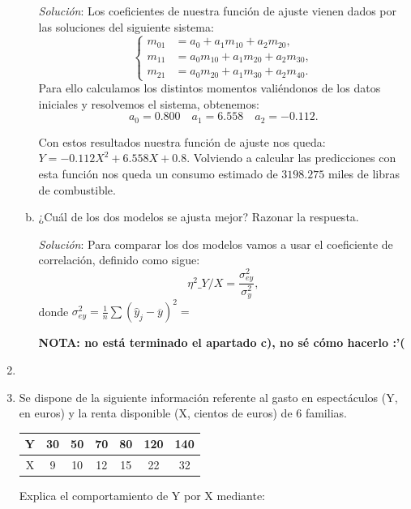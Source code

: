 \documentclass[10pt,a4paper]{article}
\begin{document}
\begin{enumerate}
\begin{enumerate}[a)]
                    \emph{Solución}: Los coeficientes de nuestra función de ajuste vienen dados por las soluciones del siguiente sistema:
                    \begin{equation*}
                    \left\{ \begin{array}{rl}
                        m_{01} &= a_0 + a_1 m_{10} + a_2 m_{20}, \\
                        m_{11} &= a_0 m_{10} + a_1 m_{20} + a_2 m_{30}, \\
                        m_{21} &= a_0 m_{20} + a_1 m_{30} + a_2 m_{40}.                    
                    \end{array}\right.
                    \end{equation*}
Para ello calculamos los distintos momentos valiéndonos de los datos iniciales y resolvemos el sistema, obtenemos:
\[
a_0 = 0.800 \quad a_1 = 6.558 \quad a_2 = -0.112.
\]

Con estos resultados nuestra función de ajuste nos queda: \(Y = -0.112X^2 + 6.558X + 0.8\). Volviendo a calcular las predicciones con esta función nos queda un consumo estimado de \(3198.275\) miles de libras de combustible. 
\item ¿Cuál de los dos modelos se ajusta mejor? Razonar la respuesta.

\emph{Solución}: Para comparar los dos modelos vamos a usar el coeficiente de correlación, definido como sigue:
\[
\eta^2\_{Y/X}=\frac{\sigma_{ey}^2}{\sigma_y^2},
\]
donde \(\sigma_{ey}^2 = \frac{1}{n}\sum \left( \hat{y}_j-\overline{y}\right)^2=\)

\textbf{NOTA: no está terminado el apartado c), no sé cómo hacerlo :'(}
\end{enumerate}

\newpage
\item
\newpage
\item Se dispone de la siguiente información referente al gasto en espectáculos (Y, en euros) y la renta disponible (X, cientos de euros) de 6 familias.

\vspace{.25cm}
\begin{tabular}{|c|c|c|c|c|c|c|}
\hline 
Y & 30 & 50 & 70 & 80 & 120 & 140 \\ 
\hline 
X & 9 & 10 & 12 & 15 & 22 & 32 \\ 
\hline 
\end{tabular} 

\vspace{0.25cm}
Explica el comportamiento de Y por X mediante:


\end{enumerate}
\end{document}

